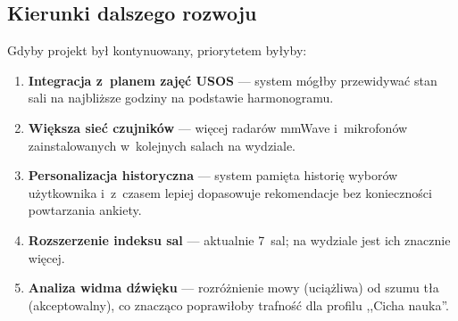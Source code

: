 \documentclass[14pt,a4paper]{extarticle}
\begin{document}
\begin{table}[H]
    \centering
    \caption{Bilans projektu MiniInfo: plusy i~minusy.}
    \label{tab:bilans}
\end{table}

\subsection{Kierunki dalszego rozwoju}

Gdyby projekt był kontynuowany, priorytetem byłyby:

\begin{enumerate}
    \item \textbf{Integracja z~planem zajęć USOS} --- system mógłby przewidywać stan sali na najbliższe godziny na podstawie harmonogramu.
    \item \textbf{Większa sieć czujników} --- więcej radarów mmWave i~mikrofonów zainstalowanych w~kolejnych salach na wydziale.
    \item \textbf{Personalizacja historyczna} --- system pamięta historię wyborów użytkownika i~z~czasem lepiej dopasowuje rekomendacje bez konieczności powtarzania ankiety.
    \item \textbf{Rozszerzenie indeksu sal} --- aktualnie 7~sal; na wydziale jest ich znacznie więcej.
    \item \textbf{Analiza widma dźwięku} --- rozróżnienie mowy (uciążliwa) od szumu tła (akceptowalny), co znacząco poprawiłoby trafność dla profilu ,,Cicha nauka''.
\end{enumerate}
\end{document}
